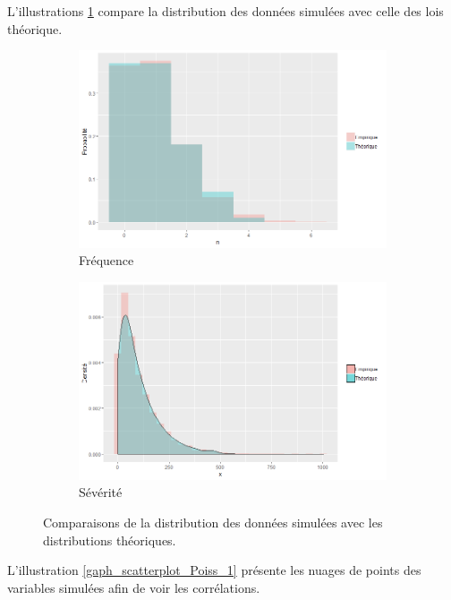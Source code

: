 \documentclass{article}
\begin{document}
	L'illustrations \ref{graph_densite_Poisson_1} compare la distribution des données simulées avec celle des lois théorique.
	
	\begin{figure}[H]
		\begin{subfigure}[l]{0.5\textwidth}
			\includegraphics[width=\textwidth]{Graph/Clayton_Poiss_1_N.png}
			\caption{Fréquence}
		\end{subfigure}
		\begin{subfigure}[r]{0.5\textwidth}
			\includegraphics[width=\textwidth]{Graph/Clayton_Poiss_1_X.png}
			\caption{Sévérité}
		\end{subfigure}
		\caption{Comparaisons de la distribution des données simulées avec les distributions théoriques.}\label{graph_densite_Poisson_1}
	\end{figure}

	L'illustration \ref{gaph_scatterplot_Poiss_1} présente les nuages de points des variables simulées afin de voir les corrélations.
\end{document}
